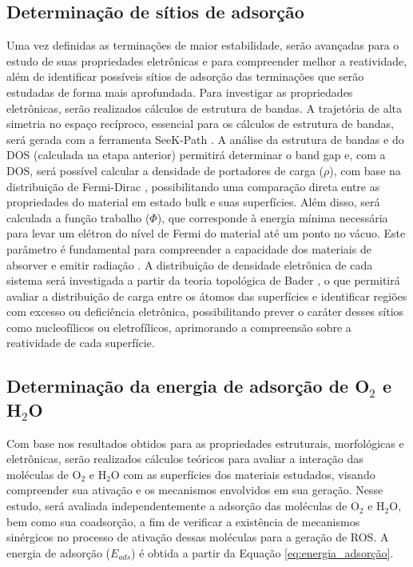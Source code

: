 \subsection{Determinação de sítios de adsorção}
Uma vez definidas as terminações de maior estabilidade, serão avançadas para o estudo de suas propriedades eletrônicas e para compreender melhor a reatividade, além de identificar possíveis sítios de adsorção das terminações que serão estudadas de forma mais aprofundada. Para investigar as propriedades eletrônicas, serão realizados cálculos de estrutura de bandas. A trajetória de alta simetria no espaço recíproco, essencial para os cálculos de estrutura de bandas, será gerada com a ferramenta SeeK-Path \cite{hinuma2017band,togo2024spglib}. A análise da estrutura de bandas e do DOS (calculada na etapa anterior) permitirá determinar o band gap e, com a DOS, será possível calcular a densidade de portadores de carga ($\rho$), com base na distribuição de Fermi-Dirac \cite{haus2016fundamentals}, possibilitando uma comparação direta entre as propriedades do material em estado bulk e suas superfícies. Além disso, será calculada a função trabalho ($\Phi$), que corresponde à energia mínima necessária para levar um elétron do nível de Fermi do material até um ponto no vácuo. Este parâmetro é fundamental para compreender a capacidade dos materiais de absorver e emitir radiação \cite{dorini2025mapping}. A distribuição de densidade eletrônica de cada sistema será investigada a partir da teoria topológica de Bader \cite{bader1981quantum}, o que permitirá avaliar a distribuição de carga entre os átomos das superfícies e identificar regiões com excesso ou deficiência eletrônica, possibilitando prever o caráter desses sítios como nucleofílicos ou eletrofílicos, aprimorando a compreensão sobre a reatividade de cada superfície.

\subsection{Determinação da energia de adsorção de O$_2$ e H$_2$O}
Com base nos resultados obtidos para as propriedades estruturais, morfológicas e eletrônicas, serão realizados cálculos teóricos para avaliar a interação das moléculas de O$_2$ e H$_2$O com as superfícies dos materiais estudados, visando compreender sua ativação e os mecanismos envolvidos em sua geração. Nesse estudo, será avaliada independentemente a adsorção das moléculas de O$_2$ e H$_2$O, bem como sua coadsorção, a fim de verificar a existência de mecanismos sinérgicos no processo de ativação dessas moléculas para a geração de ROS. A energia de adsorção ($E_{ads}$) é obtida a partir da Equação \ref{eq:energia_adsorção}.


